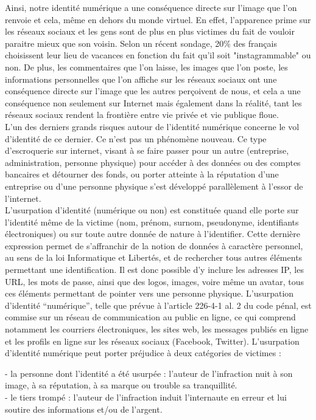\documentclass[12pt]{report}
\begin{document}
Ainsi, notre identité numérique a une conséquence directe sur l'image que l'on renvoie et cela, même en dehors du monde virtuel. En effet, l'apparence prime sur les réseaux sociaux et les gens sont de plus en plus victimes du fait de vouloir paraitre mieux que son voisin. Selon un récent sondage, 20\% des français choisissent leur lieu de vacances en fonction du fait qu'il soit "instagrammable" ou non. De plus, les commentaires que l'on laisse, les images que l'on poste, les informations personnelles que l'on affiche sur les réseaux sociaux ont une conséquence directe sur l'image que les autres perçoivent de nous, et cela a une conséquence non seulement sur Internet mais également dans la réalité, tant les réseaux sociaux rendent la frontière entre vie privée et vie publique floue. \\

L'un des derniers grands risques autour de l'identité numérique concerne le vol d'identité de ce dernier. Ce n’est pas un phénomène nouveau. Ce type d’escroquerie sur internet, visant à se faire passer pour un autre (entreprise, administration, personne physique) pour accéder à des données ou des comptes bancaires et détourner des fonds, ou porter atteinte à la réputation d’une entreprise ou d’une personne physique s’est développé parallèlement à l’essor de l’internet. \\

L’usurpation d’identité (numérique ou non) est constituée quand elle porte sur l’identité même de la victime (nom, prénom, surnom, pseudonyme, identifiants électroniques) ou sur toute autre donnée de nature à l’identifier. Cette dernière expression permet de s’affranchir de la notion de données à caractère personnel, au sens de la loi Informatique et Libertés, et de rechercher tous autres éléments permettant une identification. Il est donc possible d’y inclure les adresses IP, les URL, les mots de passe, ainsi que des logos, images, voire même un avatar, tous ces éléments permettant de pointer vers une personne physique. L’usurpation d’identité “numérique”, telle que prévue à l’article 226-4-1 al. 2 du code pénal, est commise sur un réseau de communication au public en ligne, ce qui comprend notamment les courriers électroniques, les sites web, les messages publiés en ligne et les profils en ligne sur les réseaux sociaux (Facebook, Twitter). L’usurpation d’identité numérique peut porter préjudice à deux catégories de victimes :

- la personne dont l’identité a été usurpée : l’auteur de l’infraction nuit à son image, à sa réputation, à sa marque ou trouble sa tranquillité. \\
- le tiers trompé : l’auteur de l’infraction induit l’internaute en erreur et lui soutire des informations et/ou de l’argent. \\
\end{document}
